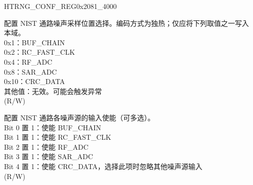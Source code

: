 \addtocounter{Regfloat}{-1}
\begin{register}{H}{TRNG\_CONF\_REG}{0x2081\_4000}
\begin{regdesc}\begin{reglist}
\item [接上页...]

\label{fielddesc:TRNGNOISEPOSSEL}\item [TRNG\_NOISE\_POS\_SEL] 配置 NIST 通路噪声采样位置选择。编码方式为独热；仅应将下列取值之一写入本域。\\
0x1：BUF\_CHAIN\\
0x2：RC\_FAST\_CLK\\
0x4：RF\_ADC\\
0x8：SAR\_ADC\\
0x10：CRC\_DATA\\
其他值：无效。可能会触发异常\\
(R/W)

\label{fielddesc:TRNGNOISESOURCESEL}\item [TRNG\_NOISE\_SOURCE\_SEL] 配置 NIST 通路各噪声源的输入使能（可多选）。\\
Bit 0 置 1：使能 BUF\_CHAIN\\
Bit 1 置 1：使能 RC\_FAST\_CLK\\
Bit 2 置 1：使能 RF\_ADC\\
Bit 3 置 1：使能 SAR\_ADC\\
Bit 4 置 1：使能 CRC\_DATA，选择此项时忽略其他噪声源输入\\
(R/W)
\end{reglist}\end{regdesc}
\end{register}


